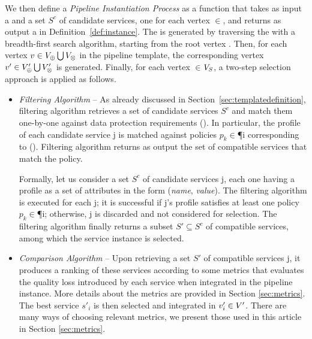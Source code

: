     We then define a \emph{Pipeline Instantiation Process} as a function that takes as input a \pipelineTemplate \tChartFunction and a set $S^c$ of candidate services, one for each vertex $\in$\V, and returns as output a \pipelineInstance \iChartFunction in Definition~\ref{def:instance}.
    The \pipelineInstance  is generated by traversing the \pipelineTemplate with a breadth-first search algorithm, starting from the root vertex .
    Then, for each vertex $v\in V_{\oplus}\bigcup V_{\otimes}$ in the pipeline template, the corresponding vertex $v'\in V'_{\oplus}\bigcup V'_{\otimes}$ is generated.
    Finally, for each vertex $\in$$V_S$, a two-step selection approach is applied as follows.
  \begin{itemize}

    \item \textit{Filtering Algorithm} -- As already discussed in Section~\ref{sec:templatedefinition}, filtering algorithm retrieves a set of candidate services $S^c$ and match them one-by-one against data protection requirements \myLambda(). In particular, the profile of each candidate service \si{j} is matched against policies $p_k$$\in$\P{i} corresponding to \myLambda(). Filtering algorithm returns as output the set of compatible services that match the policy.

                Formally, let us consider a set $S^c$ of candidate services \si{j}, each one having a profile as a set of attributes in the form (\emph{name}, \emph{value}). The filtering algorithm is executed for each \si{j}; it is successful if \si{j}'s profile satisfies at least one policy $p_k$$\in$\P{i}; otherwise, \si{j} is discarded and not considered for selection. The filtering algorithm finally returns a subset $S'\subseteq S^c$ of compatible services, among which the service instance is selected.

    \item \textit{Comparison Algorithm} -- Upon retrieving a set $S'$ of compatible services \si{j}, it produces a ranking of these services according to some metrics that evaluates the quality loss introduced by each service when integrated in the pipeline instance. More details about the metrics are provided in Section \ref{sec:metrics}.
          The best service $s'_i$ is then selected and integrated in $v'_{i}\in V'$. There are many ways of choosing relevant metrics, we present those used in this article in Section \ref{sec:metrics}.
  \end{itemize}

